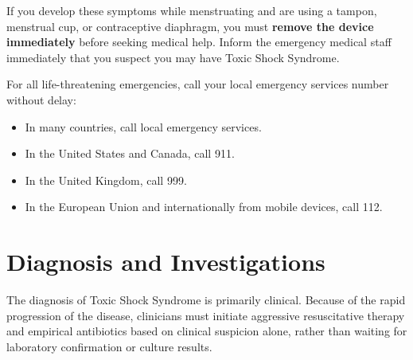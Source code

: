 If you develop these symptoms while menstruating and are using a tampon, menstrual cup, or contraceptive diaphragm, you must \textbf{remove the device immediately} before seeking medical help. Inform the emergency medical staff immediately that you suspect you may have Toxic Shock Syndrome.

For all life-threatening emergencies, call your local emergency services number without delay:
\begin{itemize}
    \item In many countries, call local emergency services.
    \item In the United States and Canada, call 911.
    \item In the United Kingdom, call 999.
    \item In the European Union and internationally from mobile devices, call 112.
\end{itemize}

\section*{Diagnosis and Investigations}
The diagnosis of Toxic Shock Syndrome is primarily clinical. Because of the rapid progression of the disease, clinicians must initiate aggressive resuscitative therapy and empirical antibiotics based on clinical suspicion alone, rather than waiting for laboratory confirmation or culture results.

